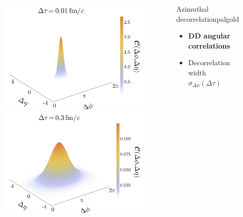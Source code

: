 \documentclass[aspectratio=169,11pt,usenames,dvipsnames]{beamer}
\begin{document}
\begin{frame}
\begin{center}
\begin{columns}[onlytextwidth,t]
\begin{center}
                \begin{figure}
                    \centering
                    \includegraphics[width=0.5\columnwidth]
                    {images/paper_Cdetadphi_3D_toy_charm_pT_1_tau_0.01_v2.png}\hfill
                    \includegraphics[width=0.5\columnwidth]
                    {images/paper_Cdetadphi_3D_toy_charm_pT_1_tau_0.3_v2.png}
                \end{figure}
            \end{center}
            \begin{center}
                \begin{custombox2}{\normalsize Azimuthal decorrelation}{palgold}
                    \small
                    \begin{varwidth}{0.99\textwidth}
                    \begin{itemize}\itemsep0em 
                        \itemsep0em
                        \footnotesize
                        \item {\bfseries\color{palgold}$\boldsymbol{D\overline{D}}$ angular correlations}
                        \item Decorrelation width $\sigma_{\Delta\phi}(\Delta\tau)$
                    \end{itemize}
                    \end{varwidth}
                \end{custombox2}


\end{center}
\end{columns}
\end{center}
\end{frame}
\end{document}
